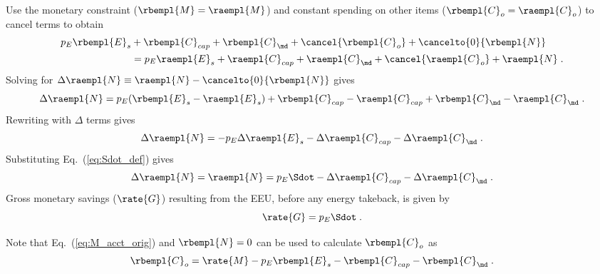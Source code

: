 \begin{landscape}
{Use the monetary constraint ($\rbempl{M} = \raempl{M}$)
and constant spending on other items ($\rbempl{C}_o = \raempl{C}_o$) to cancel terms to obtain
%
\begin{align}
  p_E \rbempl{E}_s &+ \rbempl{C}_{cap} + \rbempl{C}_{\md} + \cancel{\rbempl{C}_o} + \cancelto{0}{\rbempl{N}} \nonumber \\
                   &= p_E \raempl{E}_s + \raempl{C}_{cap} + \raempl{C}_{\md} + \cancel{\raempl{C}_o}  + \raempl{N} \; .
\end{align}
%
Solving for $\Delta \raempl{N} \equiv \raempl{N} - \cancelto{0}{\rbempl{N}}$ gives 
%
\begin{equation}
  \Delta \raempl{N} = p_E(\rbempl{E}_s - \raempl{E}_s) 
                      + \rbempl{C}_{cap} - \raempl{C}_{cap}
                      + \rbempl{C}_{\md} - \raempl{C}_{\md} \; .
\end{equation}
%
Rewriting with $\Delta$ terms gives
%
\begin{equation}
  \Delta \raempl{N} = - p_E \Delta \raempl{E}_s - \Delta \raempl{C}_{cap} - \Delta \raempl{C}_{\md} \; .
\end{equation}
%
Substituting Eq.~(\ref{eq:Sdot_def}) gives
%
\begin{equation} \label{eq:N_dot_star_empl}
  \Delta \raempl{N} = \raempl{N} = p_E \Sdot - \Delta \raempl{C}_{cap} - \Delta \raempl{C}_{\md} \; .
\end{equation}
%
Gross monetary savings ($\rate{G}$) resulting from the EEU, 
before any energy takeback, is given by 
%
\begin{equation} \label{eq:G_dot}
  \rate{G} = p_E \Sdot \; .
\end{equation}

Note that Eq.~(\ref{eq:M_acct_orig}) and $\rbempl{N} = 0$ can be used to calculate $\rbempl{C}_o$ as
%
\begin{equation} \label{eq:C_dot_o}
  \rbempl{C}_o = \rate{M} - p_E \rbempl{E}_s - \rbempl{C}_{cap} - \rbempl{C}_{\md} \; .
\end{equation}
%

}
\end{landscape}
